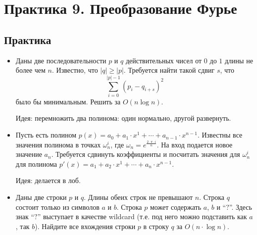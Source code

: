 \section{Практика 9. Преобразование Фурье}

\subsection{Практика}

\begin{itemize}


  \item Даны две последовательности $p$ и $q$ действительных чисел от $0$ до $1$ длины не более чем $n$. 
  Известно, что $|q| \geq |p|$. Требуется найти такой сдвиг $s$, что
  $$
    \sum_{i = 0}^{|p| - 1} (p_i - q_{i + s})^2
  $$
  было бы минимальным. Решить за $O(n \log n)$.

  Идея: перемножить два полинома: один нормально, другой развернуть.

  \item Пусть есть полином $p(x) = a_0 + a_1 \cdot x^1 + \cdots + a_{n - 1} \cdot x^{n - 1}$.
  Известны все значения полинома в точках $\omega_n^i$, где 
  $\omega_n = e^{\frac{2 \cdot \pi \cdot i}{n}}$. На вход подается новое значение $a_n$.
  Требуется сдвинуть коэффициенты и посчитать значения для $\omega_n^i$ для полинома
  $p'(x) = a_1 + a_2 \cdot x^1 + \cdots + a_n \cdot x^{n - 1}$.

  Идея: делается в лоб.

  \item Даны две строки $p$ и $q$. Длины обеих строк не превышают $n$. 
  Строка $q$ состоит только из символов $a$ и $b$.
  Строка $p$ может содержать $a$, $b$ и ``$?$''. Здесь знак ``$?$'' выступает в качестве
  wildcard (т.е. под него можно подставить как $a$, так $b$). Найдите все вхождения
  строки $p$ в строку $q$ за $O(n \cdot \log n)$.

\end{itemize}

